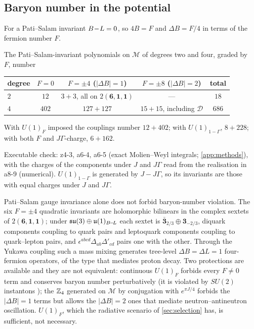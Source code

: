 \subsection{Baryon number in the potential}

For a Pati--Salam invariant $B\!-\!L=0$, so $4B=F$ and $\Delta B=F/4$ in terms of the fermion number $F$.

\begin{theorem}
\label{thm:Bcounts}
The Pati--Salam-invariant polynomials on $\mathcal M$ of degrees two and four, graded by $F$, number
\begin{center}
\small
\begin{tabular}{@{}lcccc@{}}
\toprule
degree & $F=0$ & $F=\pm4$ ($|\Delta B|=1$) & $F=\pm8$ ($|\Delta B|=2$) & total\\
\midrule
$2$ & $12$ & $3+3$, all on $2(\mathbf6,\mathbf1,\mathbf1)$ & --- & $18$\\
$4$ & $402$ & $127+127$ & $15+15$, including $\mathcal D$ & $686$\\
\bottomrule
\end{tabular}
\end{center}
With $U(1)_F$ imposed the couplings number $12+402$; with $U(1)_{1-\Gamma}$, $8+228$; with both $F$ and $J\Gamma$-charge, $6+162$.
\end{theorem}

\noindent Executable check: z4-3, a6-4, a6-5 (exact Molien--Weyl integrals; \cref{app:methods}), with the charges of the components under $J$ and $J\Gamma$
read from the realisation in a8-9 (numerical). $U(1)_{1-\Gamma}$ is generated by $J-J\Gamma$, so its invariants are those with equal charges under $J$ and
$J\Gamma$.

Pati--Salam gauge invariance alone does not forbid baryon-number violation. The six $F=\pm4$ quadratic invariants are holomorphic bilinears in the complex sextets
of $2(\mathbf6,\mathbf1,\mathbf1)$; under $\mathfrak{su}(3)\oplus\mathfrak{u}(1)_{B\!-\!L}$ each sextet is $\bar{\mathbf3}_{2/3}\oplus\mathbf3_{-2/3}$, diquark components coupling to quark pairs and leptoquark
components coupling to quark--lepton pairs, and $\epsilon^{abcd}\Delta_{ab}\Delta'_{cd}$ pairs one with the other. Through the Yukawa coupling such a mass mixing generates
tree-level $\Delta B=\Delta L=1$ four-fermion operators, of the type that mediates proton decay. Two protections are available and they are not equivalent: continuous
$U(1)_F$ forbids every $F\neq0$ term and conserves baryon number perturbatively (it is violated by $SU(2)$ instantons \cite{tHooft76}); the $\mathbb{Z}_4$ generated on $\mathcal M$ by
conjugation with $e^{\pi J/4}$ forbids the $|\Delta B|=1$ terms but allows the $|\Delta B|=2$ ones that mediate neutron--antineutron oscillation. $U(1)_F$, which the
radiative scenario of \cref{sec:selection} has, is sufficient, not necessary.

